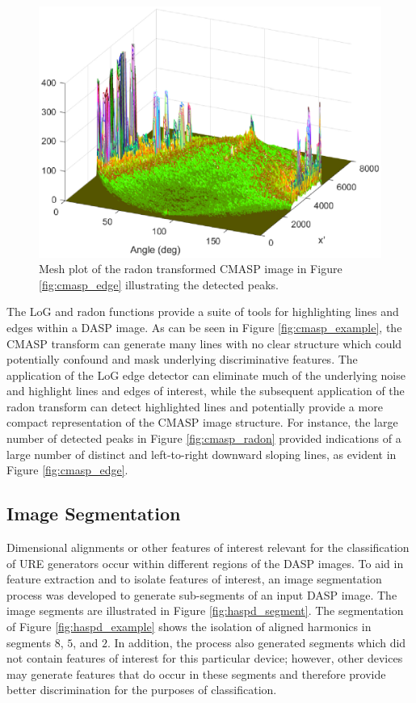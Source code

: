 \begin{figure}[tb]
	\includegraphics[width=\textwidth]{./dasp_algorithm_results/cmasp_radon_mesh_filenum_9601.eps}
	\centering
	\caption{Mesh plot of the radon transformed CMASP image in Figure \ref{fig:cmasp_edge} illustrating the detected peaks.}
	\label{fig:cmasp_peak}
\end{figure}

The LoG and radon functions provide a suite of tools for highlighting lines and edges within a DASP image.  As can be seen in Figure \ref{fig:cmasp_example}, the CMASP transform can generate many lines with no clear structure which could potentially confound and mask underlying discriminative features.  The application of the LoG edge detector can eliminate much of the underlying noise and highlight lines and edges of interest, while the subsequent application of the radon transform can detect highlighted lines and potentially provide a more compact representation of the CMASP image structure.  For instance, the large number of detected peaks in Figure \ref{fig:cmasp_radon} provided indications of a large number of distinct and left-to-right downward sloping lines, as evident in Figure \ref{fig:cmasp_edge}.

\subsection[Images Segmentation]{Image Segmentation}
\label{Image Segmentation}

Dimensional alignments or other features of interest relevant for the classification of URE generators occur within different regions of the DASP images.  To aid in feature extraction and to isolate features of interest, an image segmentation process was developed to generate sub-segments of an input DASP image.  The image segments are illustrated in Figure \ref{fig:haspd_segment}.  The segmentation of Figure \ref{fig:haspd_example} shows the isolation of aligned harmonics in segments $8$, $5$, and $2$.  In addition, the process also generated segments which did not contain features of interest for this particular device; however, other devices may generate features that do occur in these segments and therefore provide better discrimination for the purposes of classification. 

